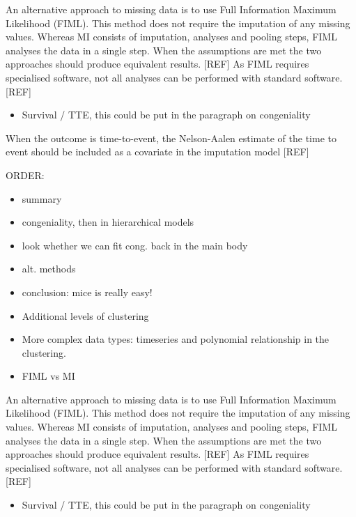 \documentclass[
]{jss}
\providecommand{\tightlist}{%
  \setlength{\itemsep}{0pt}\setlength{\parskip}{0pt}}
\begin{document}
An alternative approach to missing data is to use Full Information
Maximum Likelihood (FIML). This method does not require the imputation
of any missing values. Whereas MI consists of imputation, analyses and
pooling steps, FIML analyses the data in a single step. When the
assumptions are met the two approaches should produce equivalent
results. {[}REF{]} As FIML requires specialised software, not all
analyses can be performed with standard software. {[}REF{]}

\begin{itemize}
\tightlist
\item
  Survival / TTE, this could be put in the paragraph on congeniality
\end{itemize}

When the outcome is time-to-event, the Nelson-Aalen estimate of the time
to event should be included as a covariate in the imputation model
{[}REF{]}

ORDER:

\begin{itemize}
\item
  summary
\item
  congeniality, then in hierarchical models
\item
  look whether we can fit cong. back in the main body
\item
  alt. methods
\item
  conclusion: mice is really easy!
\item
  Additional levels of clustering
\item
  More complex data types: timeseries and polynomial relationship in the
  clustering.
\item
  FIML vs MI
\end{itemize}

An alternative approach to missing data is to use Full Information
Maximum Likelihood (FIML). This method does not require the imputation
of any missing values. Whereas MI consists of imputation, analyses and
pooling steps, FIML analyses the data in a single step. When the
assumptions are met the two approaches should produce equivalent
results. {[}REF{]} As FIML requires specialised software, not all
analyses can be performed with standard software. {[}REF{]}

\begin{itemize}
\tightlist
\item
  Survival / TTE, this could be put in the paragraph on congeniality
\end{itemize}
\end{document}
